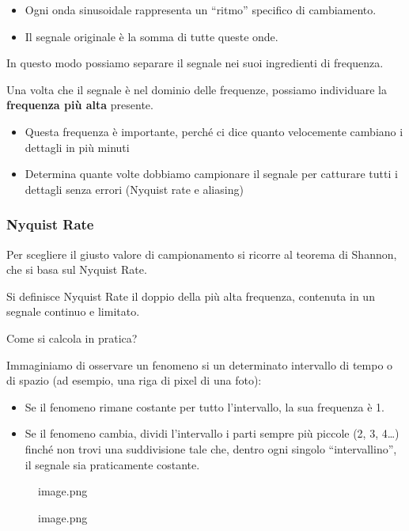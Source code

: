 \documentclass[
]{article}
\providecommand{\tightlist}{%
  \setlength{\itemsep}{0pt}\setlength{\parskip}{0pt}}
\begin{document}
\begin{itemize}
\tightlist
\item
  Ogni onda sinusoidale rappresenta un ``ritmo'' specifico di cambiamento.
\item
  Il segnale originale è la somma di tutte queste onde.
\end{itemize}

In questo modo possiamo separare il segnale nei suoi ingredienti di frequenza.

Una volta che il segnale è nel dominio delle frequenze, possiamo individuare la \textbf{frequenza più alta} presente.

\begin{itemize}
\tightlist
\item
  Questa frequenza è importante, perché ci dice quanto velocemente cambiano i dettagli in più minuti
\item
  Determina quante volte dobbiamo campionare il segnale per catturare tutti i dettagli senza errori (Nyquist rate e aliasing)
\end{itemize}

\hypertarget{nyquist-rate}{%
\subsubsection{Nyquist Rate}\label{nyquist-rate}}

Per scegliere il giusto valore di campionamento si ricorre al teorema di Shannon, che si basa sul Nyquist Rate.

Si definisce Nyquist Rate il doppio della più alta frequenza, contenuta in un segnale continuo e limitato.

Come si calcola in pratica?

Immaginiamo di osservare un fenomeno si un determinato intervallo di tempo o di spazio (ad esempio, una riga di pixel di una foto):

\begin{itemize}
\tightlist
\item
  Se il fenomeno rimane costante per tutto l'intervallo, la sua frequenza è 1.
\item
  Se il fenomeno cambia, dividi l'intervallo i parti sempre più piccole (2, 3, 4\ldots) finché non trovi una suddivisione tale che, dentro ogni singolo ``intervallino'', il segnale sia praticamente costante.
\end{itemize}

\begin{figure}
\centering
{image.png}
\caption{image.png}
\end{figure}
\end{document}
